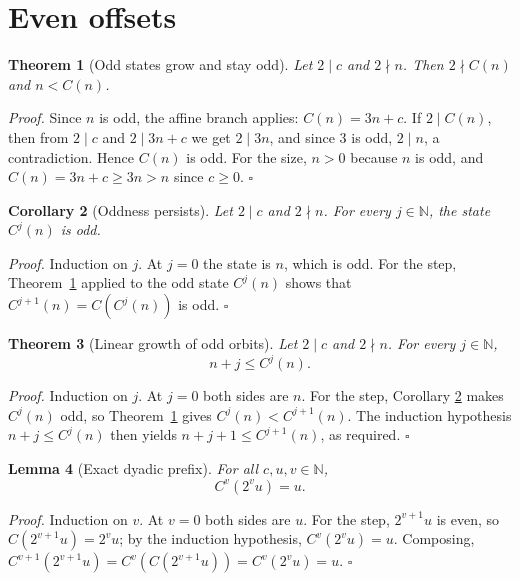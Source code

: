 \documentclass[11pt,letterpaper]{article}
\newcommand{\N}{\mathbb{N}}
\newtheorem{theorem}{Theorem}
\newtheorem{lemma}[theorem]{Lemma}
\newtheorem{corollary}[theorem]{Corollary}
\newenvironment{proof}{\noindent\textit{Proof.}}{\hfill\(\square\)}
\begin{document}
\section{Even offsets}

\begin{theorem}[Odd states grow and stay odd]\label{Thm:OffsetEvenOffsetOddStep}
Let $2\mid c$ and $2\nmid n$. Then $2\nmid C(n)$ and $n<C(n)$.
\end{theorem}

\begin{proof}
Since $n$ is odd, the affine branch applies: $C(n)=3n+c$. If $2\mid C(n)$,
then from $2\mid c$ and $2\mid 3n+c$ we get $2\mid 3n$, and since $3$ is odd,
$2\mid n$, a contradiction. Hence $C(n)$ is odd. For the size, $n>0$ because
$n$ is odd, and $C(n)=3n+c\ge 3n>n$ since $c\ge0$.
\end{proof}

\begin{corollary}[Oddness persists]\label{Cor:OffsetEvenOffsetOddPersist}
Let $2\mid c$ and $2\nmid n$. For every $j\in\N$, the state $C^{j}(n)$ is odd.
\end{corollary}

\begin{proof}
Induction on $j$. At $j=0$ the state is $n$, which is odd. For the step,
Theorem~\ref{Thm:OffsetEvenOffsetOddStep} applied to the odd state
$C^{j}(n)$ shows that $C^{j+1}(n)=C(C^{j}(n))$ is odd.
\end{proof}

\begin{theorem}[Linear growth of odd orbits]\label{Thm:OffsetEvenOffsetGrowthLower}
Let $2\mid c$ and $2\nmid n$. For every $j\in\N$,
\[
 n+j\le C^{j}(n).
\]
\end{theorem}

\begin{proof}
Induction on $j$. At $j=0$ both sides are $n$. For the step, Corollary
\ref{Cor:OffsetEvenOffsetOddPersist} makes $C^{j}(n)$ odd, so
Theorem~\ref{Thm:OffsetEvenOffsetOddStep} gives
$C^{j}(n)<C^{j+1}(n)$. The induction hypothesis $n+j\le C^{j}(n)$ then yields
$n+j+1\le C^{j+1}(n)$, as required.
\end{proof}

\begin{lemma}[Exact dyadic prefix]\label{Lem:OffsetHalvePrefix}
For all $c,u,v\in\N$,
\[
 C^{v}\left(2^{v}u\right)=u .
\]
\end{lemma}

\begin{proof}
Induction on $v$. At $v=0$ both sides are $u$. For the step, $2^{v+1}u$ is
even, so $C(2^{v+1}u)=2^{v}u$; by the induction hypothesis,
$C^{v}(2^{v}u)=u$. Composing,
$C^{v+1}(2^{v+1}u)=C^{v}(C(2^{v+1}u))=C^{v}(2^{v}u)=u$.
\end{proof}
\end{document}
